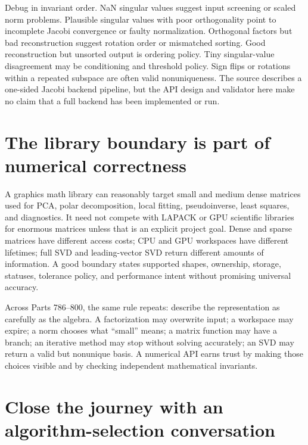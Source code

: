 Debug in invariant order. NaN singular values suggest input screening or scaled norm problems. Plausible singular values with poor orthogonality point to incomplete Jacobi convergence or faulty normalization. Orthogonal factors but bad reconstruction suggest rotation order or mismatched sorting. Good reconstruction but unsorted output is ordering policy. Tiny singular-value disagreement may be conditioning and threshold policy. Sign flips or rotations within a repeated subspace are often valid nonuniqueness. The source describes a one-sided Jacobi backend pipeline, but the API design and validator here make no claim that a full backend has been implemented or run.

\section{The library boundary is part of numerical correctness}\label{02-foundations-ii-ch038-the-library-boundary-is-part-of-numerical-correctness}

\hypertarget{02-foundations-ii-ch038-the-library-boundary-is-part-of-numerical-correctness}{}

A graphics math library can reasonably target small and medium dense matrices used for PCA, polar decomposition, local fitting, pseudoinverse, least squares, and diagnostics. It need not compete with LAPACK or GPU scientific libraries for enormous matrices unless that is an explicit project goal. Dense and sparse matrices have different access costs; CPU and GPU workspaces have different lifetimes; full SVD and leading-vector SVD return different amounts of information. A good boundary states supported shapes, ownership, storage, statuses, tolerance policy, and performance intent without promising universal accuracy.

Across Parts 786--800, the same rule repeats: describe the representation as carefully as the algebra. A factorization may overwrite input; a workspace may expire; a norm chooses what ``small'' means; a matrix function may have a branch; an iterative method may stop without solving accurately; an SVD may return a valid but nonunique basis. A numerical API earns trust by making those choices visible and by checking independent mathematical invariants.

\section{Close the journey with an algorithm-selection conversation}\label{02-foundations-ii-ch038-close-the-journey-with-an-algorithm-selection-conversation}

